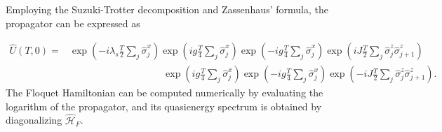 \documentclass[a4paper, 10pt]{article}
\begin{document}
Employing the Suzuki-Trotter decomposition and Zassenhaus’ formula, the propagator can be expressed as

\begin{align}
    \hat{U}(T,0) =& \exp\left(-i \lambda_s \frac{T}{2} \sum_{j}\hat{\sigma}_j^x\right)
    \exp\left(i g \frac{T}{4} \sum_{j}\hat{\sigma}_j^x\right)
    \exp\left(-i g \frac{T}{4} \sum_{j}\hat{\sigma}_j^x\right)\exp\left(i J \frac{T}{2} \sum_{j} \hat{\sigma}_j^z \hat{\sigma}_{j+1}^z\right)\nonumber\\
    &\hspace{4cm}\exp\left(i g \frac{T}{4} \sum_{j}\hat{\sigma}_j^x\right)\exp\left(-i g \frac{T}{4} \sum_{j}\hat{\sigma}_j^x\right)\exp\left(-i J \frac{T}{2} \sum_{j} \hat{\sigma}_j^z \hat{\sigma}_{j+1}^z\right).
\end{align}
The Floquet Hamiltonian can be computed numerically by evaluating the logarithm of the propagator, and its quasienergy spectrum is obtained by diagonalizing $\hat{\mathcal{H}}_F$.
\end{document}
